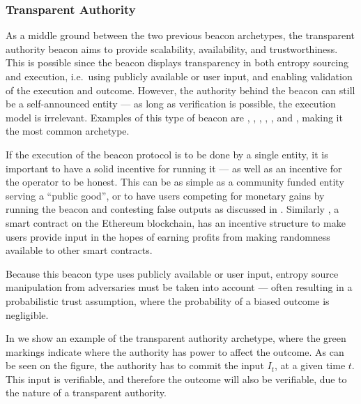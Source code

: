 \subsubsection{Transparent Authority}\label{ssub:transparent_authority}
As a middle ground between the two previous beacon archetypes, the transparent authority beacon aims to provide scalability, availability, and trustworthiness.
This is possible since the beacon displays transparency in both entropy sourcing and execution, i.e.\ using publicly available or user input, and enabling validation of the execution and outcome.
However, the authority behind the beacon can still be a self-announced entity --- as long as verification is possible, the execution model is irrelevant.
Examples of this type of beacon are , , , , ,  and , making it the most common archetype.

If the execution of the beacon protocol is to be done by a single entity, it is important to have a solid incentive for running it --- as well as an incentive for the operator to be honest.
This can be as simple as a community funded entity serving a \enquote{public good}, or to have users competing for monetary gains by running the beacon and contesting false outputs as discussed in \citet{bunz2017proofsof}.
Similarly , a smart contract on the Ethereum blockchain, has an incentive structure to make users provide input in the hopes of earning profits from making randomness available to other smart contracts.

Because this beacon type uses publicly available or user input, entropy source manipulation from adversaries must be taken into account --- often resulting in a probabilistic trust assumption, where the probability of a biased outcome is negligible.

In  we show an example of the transparent authority archetype, where the green markings indicate where the authority has power to affect the outcome.
As can be seen on the figure, the authority has to commit the input $I_t$, at a given time $t$.
This input is verifiable, and therefore the outcome will also be verifiable, due to the nature of a transparent authority.


